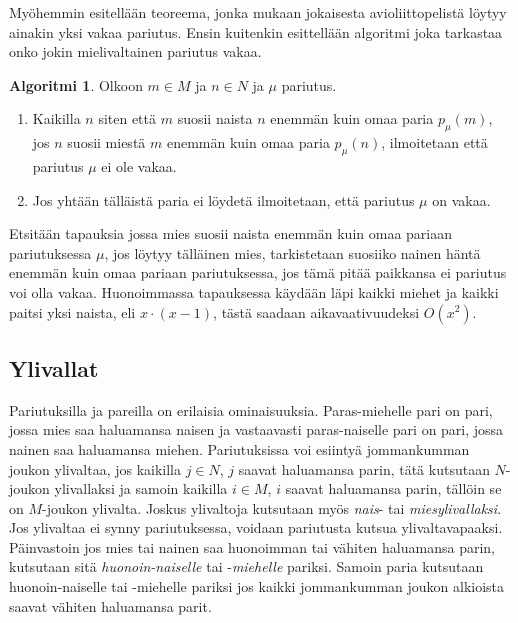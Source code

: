 \documentclass[finnish]{tktltiki2}
\theoremstyle{definition}
\newtheorem{alg}[lau]{Algoritmi}
\theoremstyle{remark}
\begin{document}
Myöhemmin esitellään teoreema, jonka mukaan jokaisesta avioliittopelistä löytyy ainakin yksi vakaa pariutus. Ensin kuitenkin esittellään algoritmi joka tarkastaa onko jokin mielivaltainen pariutus vakaa.
\begin{alg}\cite[s. 8]{gusfield1989stable}
Olkoon $m \in M$ ja $n \in N$ ja $\mu$ pariutus.
\begin{enumerate}
	\item Kaikilla $n$ siten että $m$ suosii naista $n$ enemmän kuin omaa paria $p_{\mu}(m)$, jos $n$ suosii miestä $m$ enemmän kuin omaa paria $p_{\mu}(n)$, ilmoitetaan että pariutus $\mu$ ei ole vakaa.
	\item Jos yhtään tälläistä paria ei löydetä ilmoitetaan, että pariutus $\mu$ on vakaa.
\end{enumerate}
\end{alg}

Etsitään tapauksia jossa mies suosii naista enemmän kuin omaa pariaan pariutuksessa $\mu$,
jos löytyy tälläinen mies, tarkistetaan suosiiko nainen häntä enemmän kuin omaa pariaan pariutuksessa, jos tämä pitää paikkansa ei pariutus voi olla vakaa.
Huonoimmassa tapauksessa käydään läpi kaikki miehet ja kaikki paitsi yksi naista, eli $x\cdot(x-1)$, tästä saadaan aikavaativuudeksi $O(x^2)$.

\subsection{Ylivallat}
Pariutuksilla ja pareilla on erilaisia ominaisuuksia. Paras-miehelle pari on pari, jossa mies saa haluamansa naisen ja vastaavasti paras-naiselle pari on pari, jossa nainen saa haluamansa miehen. Pariutuksissa voi esiintyä jommankumman joukon ylivaltaa, jos kaikilla $j \in N$, $j$ saavat haluamansa parin, tätä kutsutaan $N$-joukon ylivallaksi ja samoin kaikilla $i \in M$, $i$ saavat haluamansa parin, tällöin se on $M$-joukon ylivalta. Joskus ylivaltoja kutsutaan myös \emph{nais}- tai \emph{miesylivallaksi}. Jos ylivaltaa ei synny pariutuksessa, voidaan pariutusta kutsua ylivaltavapaaksi.
Päinvastoin jos mies tai nainen saa huonoimman tai vähiten haluamansa parin, kutsutaan sitä \emph{huonoin-naiselle} tai -\emph{miehelle} pariksi. Samoin paria kutsutaan huonoin-naiselle tai -miehelle pariksi jos kaikki jommankumman joukon alkioista saavat vähiten haluamansa parit.
\end{document}
